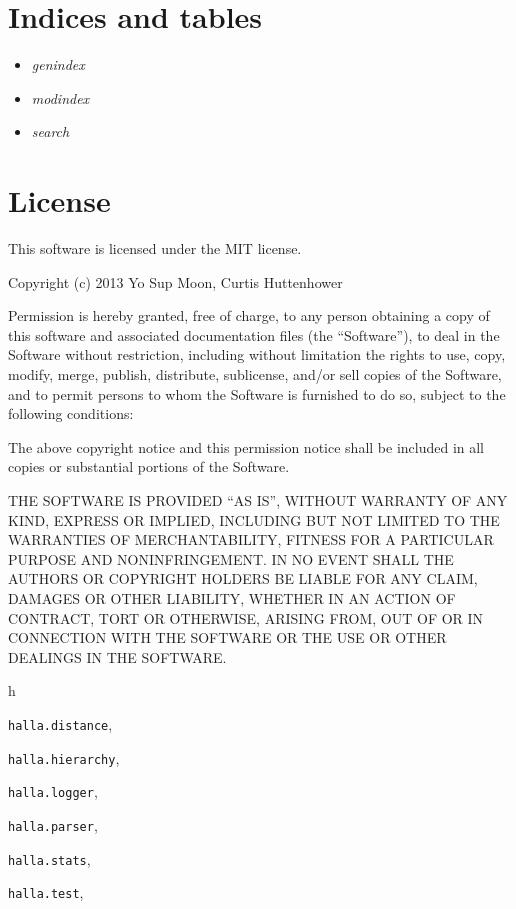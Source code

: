 \documentclass[letterpaper,10pt,english]{sphinxmanual}
\begin{document}
\section{Indices and tables}
\label{index:indices-and-tables}\begin{itemize}
\item {} 
\emph{genindex}

\item {} 
\emph{modindex}

\item {} 
\emph{search}

\end{itemize}


\section{License}
\label{index:license}
This software is licensed under the MIT license.

Copyright (c) 2013 Yo Sup Moon, Curtis Huttenhower

Permission is hereby granted, free of charge, to any person obtaining a copy of this software and associated documentation files (the ``Software''), to deal in the Software without restriction, including without limitation the rights to use, copy, modify, merge, publish, distribute, sublicense, and/or sell copies of the Software, and to permit persons to whom the Software is furnished to do so, subject to the following conditions:

The above copyright notice and this permission notice shall be included in all copies or substantial portions of the Software.

THE SOFTWARE IS PROVIDED ``AS IS'', WITHOUT WARRANTY OF ANY KIND, EXPRESS OR IMPLIED, INCLUDING BUT NOT LIMITED TO THE WARRANTIES OF MERCHANTABILITY, FITNESS FOR A PARTICULAR PURPOSE AND NONINFRINGEMENT. IN NO EVENT SHALL THE AUTHORS OR COPYRIGHT HOLDERS BE LIABLE FOR ANY CLAIM, DAMAGES OR OTHER LIABILITY, WHETHER IN AN ACTION OF CONTRACT, TORT OR OTHERWISE, ARISING FROM, OUT OF OR IN CONNECTION WITH THE SOFTWARE OR THE USE OR OTHER DEALINGS IN THE SOFTWARE.


\renewcommand{\indexname}{Python Module Index}
\begin{theindex}
\def\bigletter#1{{\Large\sffamily#1}\nopagebreak\vspace{1mm}}
\bigletter{h}
\item {\texttt{halla.distance}}, \pageref{index:module-halla.distance}
\item {\texttt{halla.hierarchy}}, \pageref{index:module-halla.hierarchy}
\item {\texttt{halla.logger}}, \pageref{index:module-halla.logger}
\item {\texttt{halla.parser}}, \pageref{index:module-halla.parser}
\item {\texttt{halla.stats}}, \pageref{index:module-halla.stats}
\item {\texttt{halla.test}}, \pageref{index:module-halla.test}
\end{theindex}

\renewcommand{\indexname}{Index}
\printindex
\end{document}
